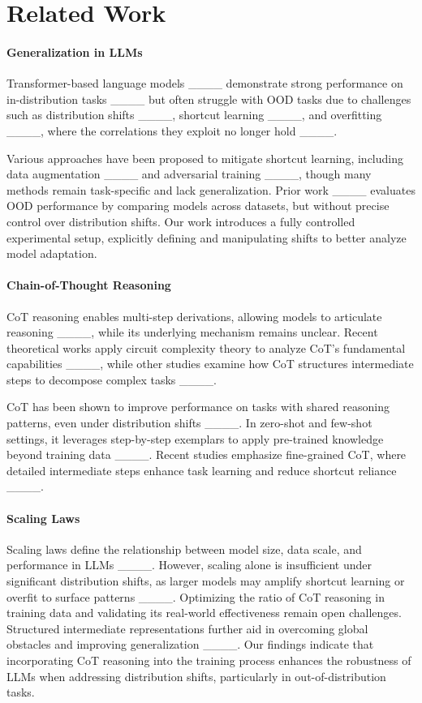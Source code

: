 \section{Related Work}
\paragraph{Generalization in LLMs}
Transformer-based language models ____ demonstrate strong performance on in-distribution tasks ____ but often struggle with OOD tasks due to challenges such as distribution shifts ____, shortcut learning ____, and overfitting ____, where the correlations they exploit no longer hold ____.

Various approaches have been proposed to mitigate shortcut learning, including data augmentation ____ and adversarial training ____, though many methods remain task-specific and lack generalization. Prior work ____ evaluates OOD performance by comparing models across datasets, but without precise control over distribution shifts. Our work introduces a fully controlled experimental setup, explicitly defining and manipulating shifts to better analyze model adaptation.
\vspace{-\baselineskip}
\paragraph{Chain-of-Thought Reasoning}
CoT reasoning enables multi-step derivations, allowing models to articulate reasoning ____, while its underlying mechanism remains unclear. Recent theoretical works apply circuit complexity theory to analyze CoT’s fundamental capabilities ____, while other studies examine how CoT structures intermediate steps to decompose complex tasks ____. 

CoT has been shown to improve performance on tasks with shared reasoning patterns, even under distribution shifts ____. In zero-shot and few-shot settings, it leverages step-by-step exemplars to apply pre-trained knowledge beyond training data ____. Recent studies emphasize fine-grained CoT, where detailed intermediate steps enhance task learning and reduce shortcut reliance ____.
\vspace{-\baselineskip}
\paragraph{Scaling Laws}
Scaling laws define the relationship between model size, data scale, and performance in LLMs ____. However, scaling alone is insufficient under significant distribution shifts, as larger models may amplify shortcut learning or overfit to surface patterns ____.
Optimizing the ratio of CoT reasoning in training data and validating its real-world effectiveness remain open challenges. Structured intermediate representations further aid in overcoming global obstacles and improving generalization ____. Our findings indicate that incorporating CoT reasoning into the training process enhances the robustness of LLMs when addressing distribution shifts, particularly in out-of-distribution tasks.